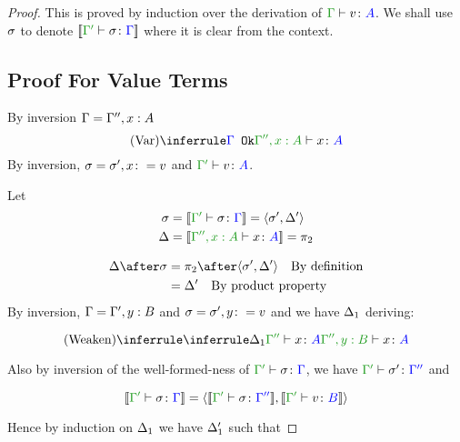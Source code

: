 \documentclass{report}
\begin{document}
\begin{framed}
    \begin{proof}
        This is proved by induction over the derivation of $\typerelation{\G}{v}{A}$.
        We shall use $\sigma$ to denote $\deno{\typerelation{\G'}{\si}{\G}}$ where it is clear from the context.
        \subsection{Proof For Value Terms}
        By inversion $\Gamma = \Gamma'', x:A$
        \begin{equation}
            \ntreeruleI{Var}{\ok{\G}}{\typerelation{\G'', x:A}{x}{A}}
        \end{equation}
        By inversion, $\sigma = \sigma', x\colon= v$ and $\typerelation{\G'}{v}{A}$.
        
        Let 
        \begin{align*}
            \si &=\deno{\typerelation{\G'}{\si}{\G}} = \pr{\si'}{\D'}\\
            \D &=\deno{\typerelation{\G'', x:A}{x}{A}} = \pp\\
        \end{align*}
        
        \begin{align*}
            \D\after\si &= \pp\after\pr{\si'}{\D'}\qt{By definition}\\
            &= \D'\qt{By product property}
        \end{align*}
        By inversion, $\Gamma = \Gamma', y:B$ and $\sigma = \sigma', y\colon= v$
        and we have $\Delta_1$ deriving:
        
        \begin{equation}
            \ntreeruleI{Weaken}{\treeruleI{\D_1}{\typerelation{\G''}{x}{A}}}{\typerelation{\G'',y: B}{x}{A}}
        \end{equation}
        
        Also by inversion of the well-formed-ness of $\typerelation{\G'}{\si}{\G}$, we have $\typerelation{\G'}{\si'}{\G''}$ and 
        
        \begin{equation}
            \deno{\typerelation{\G'}{\si}{\G}} = \pr{\deno{\typerelation{\G'}{\si}{\G''}}}{\deno{\typerelation{\G'}{v}{B}}}
        \end{equation}
        
        Hence by induction on $\Delta_1$ we have $\Delta_1'$ such that
        

\end{proof}
\end{framed}
\end{document}
